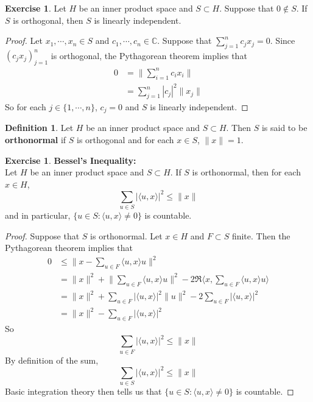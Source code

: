 \documentclass[12pt]{amsart}
\theoremstyle{definition}
\newtheorem{defn}[definition]{Definition}
\newtheorem{ex}[definition]{Exercise}
\newcommand{\C}{\mathbb{C}}
\newcommand{\tbf}[1]{\textbf{#1}}
\renewcommand{\r}{\rangle}
\renewcommand{\l}{\langle}
\DeclareMathOperator*{\0}{\mbf{0}}
\DeclareMathOperator*{\1}{\mbf{1}}
\newcommand{\lex}[1]{\label{ex:#1}}
\newcommand{\ld}[1]{\label{defn:#1}}
\begin{document}
\begin{ex} \lex{}
	Let $H$ be an inner product space and $S \subset H$. Suppose that $0 \not \in S$. If $S$ is orthogonal, then $S$ is linearly independent.
\end{ex}

\begin{proof}
	Let $x_1, \cdots, x_n \in S$ and $c_1, \cdots, c_n \in \C$. Suppose that $\sum\limits_{j =1}^n c_j x_j = 0 $. Since $(c_j x_j)_{j=1}^n$ is orthogonal, the Pythagorean theorem implies that 
	\begin{align*}
		0
		&= \bigg \| \sum_{i=1}^n c_i x_i \bigg \| \\
		&= \sum_{j=1}^n  |c_j|^2 \| x_j\| 
	\end{align*}
	So for each $j \in \{ 1 , \cdots, n\}$, $c_j = 0$ and $S$ is linearly independent.
\end{proof}

\begin{defn} \ld{}
	Let $H$ be an inner product space and $S \subset H$. Then $S$ is said to be \tbf{orthonormal} if $S$ is orthogonal and for each $x \in S$, $\|x \| = 1$.
\end{defn}

\begin{ex} \lex{}\tbf{Bessel's Inequality:}\\
Let $H$ be an inner product space and $S \subset H$. If $S$ is orthonormal, then for each $x \in H$, $$\sum_{u \in S} | \l u, x \r |^2  \leq \|x\|$$
and in particular, $\{u \in S: \l u, x\r \neq 0\}$ is countable.
\end{ex}

\begin{proof}
Suppose that $S$ is orthonormal. Let $x \in H$ and $F \subset S$ finite. Then the Pythagorean theorem implies that  
\begin{align*}
0 
& \leq \bigg \|x - \sum_{u \in F} \l u, x \r u \bigg \|^2 \\
&= \|x\|^2 + \bigg \| \sum_{u \in F} \l u, x \r u \bigg \|^2 - 2 \Re \bigg \l x, \sum_{u \in F} \l u, x \r u \bigg \r  \\
&= \|x\|^2 +  \sum_{u \in F} |\l u, x \r|^2 \|u\|^2 - 2 \sum_{u \in F} | \l u, x \r|^2  \\
&= \|x\|^2 -  \sum_{u \in F} |\l u, x \r|^2 
\end{align*}
So $$\sum_{u \in F} | \l u, x \r |^2  \leq \|x\|$$
By definition of the sum, $$\sum_{u \in S} | \l u, x \r |^2  \leq \|x\|$$
Basic integration theory then tells us that $\{u \in S: \l u, x\r \neq 0\}$ is countable.
\end{proof}
\end{document}
